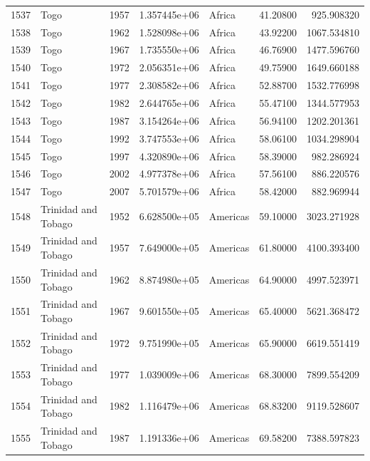 \documentclass[
  letterpaper,
  DIV=11,
  numbers=noendperiod]{scrreprt}
\begin{document}
\begin{tabular}{llrrlrr}
1537 &                      Togo &  1957 &  1.357445e+06 &    Africa &  41.20800 &     925.908320 \\
1538 &                      Togo &  1962 &  1.528098e+06 &    Africa &  43.92200 &    1067.534810 \\
1539 &                      Togo &  1967 &  1.735550e+06 &    Africa &  46.76900 &    1477.596760 \\
1540 &                      Togo &  1972 &  2.056351e+06 &    Africa &  49.75900 &    1649.660188 \\
1541 &                      Togo &  1977 &  2.308582e+06 &    Africa &  52.88700 &    1532.776998 \\
1542 &                      Togo &  1982 &  2.644765e+06 &    Africa &  55.47100 &    1344.577953 \\
1543 &                      Togo &  1987 &  3.154264e+06 &    Africa &  56.94100 &    1202.201361 \\
1544 &                      Togo &  1992 &  3.747553e+06 &    Africa &  58.06100 &    1034.298904 \\
1545 &                      Togo &  1997 &  4.320890e+06 &    Africa &  58.39000 &     982.286924 \\
1546 &                      Togo &  2002 &  4.977378e+06 &    Africa &  57.56100 &     886.220576 \\
1547 &                      Togo &  2007 &  5.701579e+06 &    Africa &  58.42000 &     882.969944 \\
1548 &       Trinidad and Tobago &  1952 &  6.628500e+05 &  Americas &  59.10000 &    3023.271928 \\
1549 &       Trinidad and Tobago &  1957 &  7.649000e+05 &  Americas &  61.80000 &    4100.393400 \\
1550 &       Trinidad and Tobago &  1962 &  8.874980e+05 &  Americas &  64.90000 &    4997.523971 \\
1551 &       Trinidad and Tobago &  1967 &  9.601550e+05 &  Americas &  65.40000 &    5621.368472 \\
1552 &       Trinidad and Tobago &  1972 &  9.751990e+05 &  Americas &  65.90000 &    6619.551419 \\
1553 &       Trinidad and Tobago &  1977 &  1.039009e+06 &  Americas &  68.30000 &    7899.554209 \\
1554 &       Trinidad and Tobago &  1982 &  1.116479e+06 &  Americas &  68.83200 &    9119.528607 \\
1555 &       Trinidad and Tobago &  1987 &  1.191336e+06 &  Americas &  69.58200 &    7388.597823 \\

\end{tabular}
\end{document}
